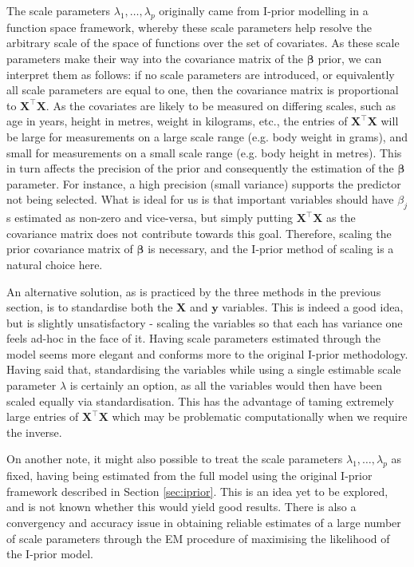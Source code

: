 The scale parameters $\lambda_1, \dots, \lambda_p$ originally came from I-prior modelling in a function space framework, whereby these scale parameters help resolve the arbitrary scale of the space of functions over the set of covariates. As these scale parameters make their way into the covariance matrix of the $\boldsymbol\beta$ prior, we can interpret them as follows: if no scale parameters are introduced, or equivalently all scale parameters are equal to one, then the covariance matrix is proportional to $\mathbf X^\top \mathbf X$. As the covariates are likely to be measured on differing scales, such as age in years, height in metres, weight in kilograms, etc., the entries of $\mathbf X^\top \mathbf X$ will be large for measurements on a large scale range (e.g. body weight in grams), and small for measurements on a small scale range (e.g. body height in metres). This in turn affects the precision of the prior and consequently the estimation of the $\boldsymbol\beta$ parameter. For instance, a high precision (small variance) supports the predictor not being selected. What is ideal for us is that important variables should have $\beta_j$s estimated as non-zero and vice-versa, but simply putting $\mathbf X^\top \mathbf X$ as the covariance matrix does not contribute towards this goal. Therefore, scaling the prior covariance matrix of $\boldsymbol\beta$ is necessary, and the I-prior method of scaling is a natural choice here.

An alternative solution, as is practiced by the three methods in the previous section, is to standardise both the $\mathbf X$ and $\mathbf y$ variables. This is indeed a good idea, but is slightly unsatisfactory - scaling the variables so that each has variance one feels ad-hoc in the face of it. Having scale parameters estimated through the model seems more elegant and conforms more to the original I-prior methodology. Having said that, standardising the variables while using a single estimable scale parameter $\lambda$ is certainly an option, as all the variables would then have been scaled equally via standardisation. This has the advantage of taming extremely large entries of $\mathbf X^\top \mathbf X$ which may be problematic computationally when we require the inverse.\label{sec:bvsiprior}

\begin{remark}
	On another note, it might also possible to treat the scale parameters $\lambda_1, \dots, \lambda_p$ as fixed, having being estimated from the full model using the original I-prior framework described in Section \ref{sec:iprior}. This is an idea yet to be explored, and is not known whether this would yield good results. There is also a convergency and accuracy issue in obtaining reliable estimates of a large number of scale parameters through the EM procedure of maximising the likelihood of the I-prior model.
\end{remark}

